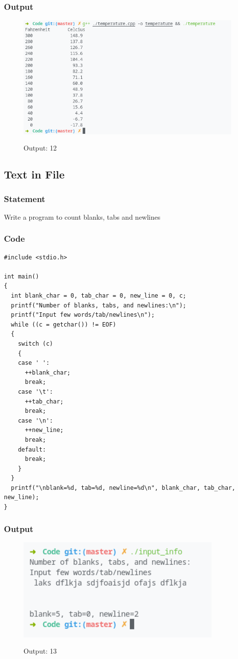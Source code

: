 \subsubsection{Output}
\begin{figure}[!htb]
  \centering
  \includegraphics[width=6in]{Images/temperature.png}
  \label{output:12}
  \caption{Output: 12}
\end{figure}


\pagebreak
\subsection{Text in File}
\subsubsection{Statement}
Write a program to count blanks, tabs and newlines
\subsubsection{Code}
\begin{verbatim} 
#include <stdio.h>

int main()
{
  int blank_char = 0, tab_char = 0, new_line = 0, c;
  printf("Number of blanks, tabs, and newlines:\n");
  printf("Input few words/tab/newlines\n");
  while ((c = getchar()) != EOF)
  {
    switch (c)
    {
    case ' ':
      ++blank_char;
      break;
    case '\t':
      ++tab_char;
      break;
    case '\n':
      ++new_line;
      break;
    default:
      break;
    }
  }
  printf("\nblank=%d, tab=%d, newline=%d\n", blank_char, tab_char, new_line);
}
\end{verbatim}
\subsubsection{Output}
\begin{figure}[!htb]
  \centering
  \includegraphics[width=4in]{Images/input_info.png}
  \label{output:13}
  \caption{Output: 13}
\end{figure}


